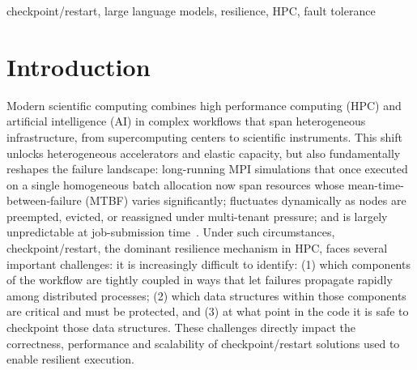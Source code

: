 \documentclass[conference]{IEEEtran}
\begin{document}
\begin{abstract}
Adding reliable checkpoint/restart support to an MPI scientific application is a time-consuming expert effort that requires deep knowledge of both the application and resilience. We ask whether a frontier large language model can perform this work end-to-end without human intervention. We assemble a benchmark suite of MPI applications spanning diverse domains and computation patterns, and drive an iterative code-generation loop for each application using Anthropic's Claude Opus 4.7 invoked through the OpenCode CLI. Across seventeen scientific applications, the LLM generates working checkpoint/restart code in roughly 44~minutes on average while consuming 3.2~M tokens per application. The generated code adds statistically zero overhead during normal failure-free execution on sixteen of seventeen applications ($\pm 2\%$ of original execution time), and recovers from injected process failures with efficiency comparable to human-engineered checkpoint/restart implementations. These results suggest that automated end-to-end LLM-driven resilience engineering is technically viable today for a meaningful fraction of HPC applications.
\end{abstract}

\begin{IEEEkeywords}
checkpoint/restart, large language models, resilience, HPC, fault tolerance
\end{IEEEkeywords}

\section{Introduction}
\label{sec:intro}

Modern scientific computing combines high performance computing (HPC) and
artificial intelligence (AI) in complex workflows that span heterogeneous infrastructure, from supercomputing centers to scientific instruments. This shift unlocks heterogeneous accelerators and elastic capacity, but also fundamentally reshapes the failure landscape: long-running MPI simulations that once executed on a single homogeneous batch allocation now span resources whose mean-time-between-failure (MTBF) varies significantly; fluctuates dynamically as nodes are preempted, evicted, or reassigned under multi-tenant pressure; and is largely unpredictable at job-submission time~\cite{cappello2014toward,Diaspora-Overview-eScience24}. Under such circumstances, checkpoint/restart, the dominant resilience mechanism in HPC, faces several important challenges:
it is increasingly difficult to identify: (1) which components of the workflow are tightly coupled in ways that let failures propagate rapidly among distributed processes; (2) which data structures within those components are critical and must be protected, and (3) at what point in the code it is safe to checkpoint those data structures. These challenges directly impact the correctness, performance and scalability of checkpoint/restart solutions used to enable resilient execution.
\end{document}
